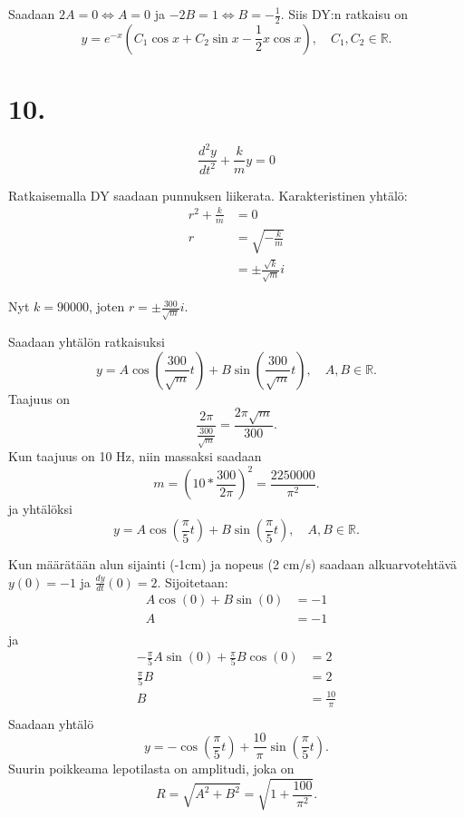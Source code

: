 \documentclass{article}
\begin{document}
Saadaan $2A = 0 \iff A = 0$ ja $-2B = 1 \iff B = -\frac{1}{2}$.
Siis DY:n ratkaisu on
\[
  y = e^{-x}(C_1\cos x + C_2\sin x - \frac{1}{2}x\cos x), \quad C_1, C_2 \in \mathbb{R}.
\]

\section*{10.}

\[
  \frac{d^2 y}{d t^2} + \frac{k}{m}y = 0
\]

Ratkaisemalla DY saadaan punnuksen liikerata.
Karakteristinen yhtälö:
\begin{align*}
  r^2 + \frac{k}{m} &= 0 \\
  r &= \sqrt{-\frac{k}{m}} \\
    &= \pm \frac{\sqrt{k}}{\sqrt{m}}i
\end{align*}

Nyt $k = 90000$, joten $r = \pm \frac{300}{\sqrt{m}}i$.

Saadaan yhtälön ratkaisuksi
\[
  y = A\cos(\frac{300}{\sqrt{m}}t) + B\sin(\frac{300}{\sqrt{m}}t), \quad A,B \in \mathbb{R}.
\]
Taajuus on
\[
  \frac{2\pi}{\frac{300}{\sqrt{m}}} = \frac{2\pi \sqrt{m}}{300}.
\]
Kun taajuus on 10 Hz, niin massaksi saadaan
\[
  m = (10*\frac{300}{2\pi})^2 = \frac{2250000}{\pi^2}.
\]
ja yhtälöksi
\[
  y = A\cos(\frac{\pi}{5}t) + B\sin(\frac{\pi}{5}t), \quad A,B \in \mathbb{R}.
\]

Kun määrätään alun sijainti (-1cm) ja nopeus (2 cm/s) saadaan alkuarvotehtävä
$y(0) = -1$ ja $\frac{dy}{dt}(0) = 2$. Sijoitetaan:
\begin{align*}
  A\cos(0) + B\sin(0) &= -1 \\
  A &= -1 \\
\end{align*}
ja
\begin{align*}
  -\frac{\pi}{5}A\sin(0) + \frac{\pi}{5}B\cos(0) &= 2 \\
  \frac{\pi}{5}B &= 2 \\
  B &= \frac{10}{\pi} \\
\end{align*}
Saadaan yhtälö
\[
  y = -\cos(\frac{\pi}{5}t) + \frac{10}{\pi}\sin(\frac{\pi}{5}t).
\]
Suurin poikkeama lepotilasta on amplitudi, joka on
\[
  R = \sqrt{A^2 + B^2} = \sqrt{1 + \frac{100}{\pi^2}}.
\]
\end{document}

